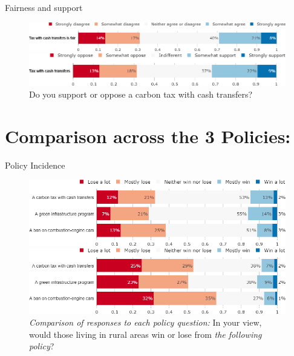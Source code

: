 \documentclass[aspectratio=169,9pt,dvipsnames]{beamer}
\begin{document}
\begin{frame}{Fairness and support}%
\begin{figure}[h!]
\centering
\caption{Do you agree or disagree with the following statement: ``A carbon tax with cash transfers is fair."}
\includegraphics[width=\textwidth]{../figures/DK/tax_transfers_fair_DK.png}
\vspace{.5cm}
\centering
\caption{Do you support or oppose a carbon tax with cash transfers?}
\includegraphics[width=\textwidth]{../figures/DK/tax_transfers_support_DK.png}
\end{figure}

\end{frame}

\section{Comparison across the 3 Policies:}

\begin{frame}{Policy Incidence}%
\begin{figure}[h!]
\centering
\caption{\textit{Comparison of responses to each policy question:} Do you think that financially your household would win or lose from \textit{the policy}?}
\includegraphics[width=.7\textwidth]{../figures/DK/policies_win_lose_self_DK.png}
\vspace{-.1cm}
\centering
\caption{\textit{Comparison of responses to each policy question:} In your view, would those living in rural areas win or lose from \textit{the following policy}?}
\includegraphics[width=.7\textwidth]{../figures/DK/policies_win_lose_rural_DK.png}
\end{figure}
\end{frame}
\end{document}
